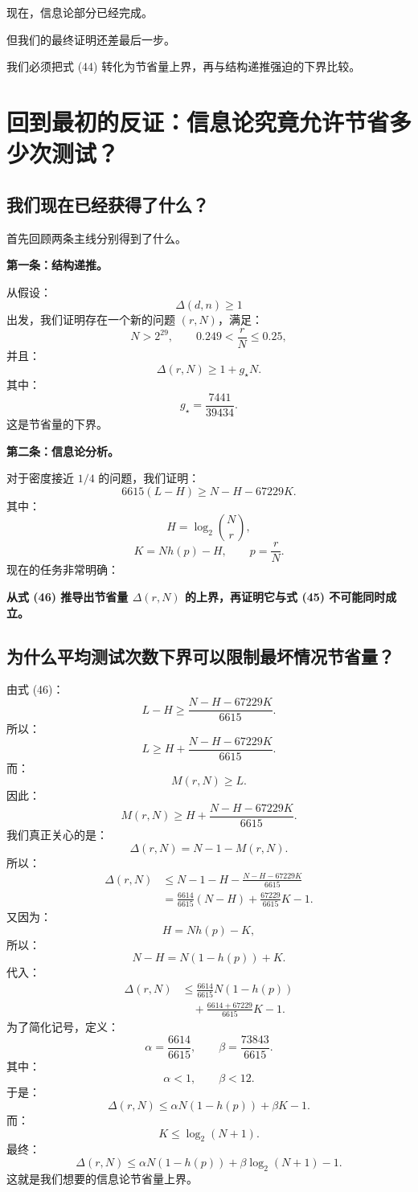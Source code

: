 \documentclass[UTF8,11pt]{ctexart}
\begin{document}
现在，信息论部分已经完成。

但我们的最终证明还差最后一步。

我们必须把式 (44) 转化为节省量上界，再与结构递推强迫的下界比较。

\section{回到最初的反证：信息论究竟允许节省多少次测试？}
\subsection{我们现在已经获得了什么？}
首先回顾两条主线分别得到了什么。

\textbf{第一条：结构递推。}

从假设：
\[\Delta(d,n)\ge1\]
出发，我们证明存在一个新的问题 $(r,N)$，满足：
\[N>2^{29},\qquad0.249<\frac rN\le0.25,\]
并且：
\begin{equation}\boxed{\Delta(r,N)\ge1+g_\star N.}\tag{45}\end{equation}
其中：
\[g_\star=\frac{7441}{39434}.\]
这是节省量的下界。

\textbf{第二条：信息论分析。}

对于密度接近 $1/4$ 的问题，我们证明：
\begin{equation}\boxed{6615(L-H)\ge N-H-67229K.}\tag{46}\end{equation}
其中：
\[H=\log_2\binom Nr,\]
\[K=Nh(p)-H,\qquad p=\frac rN.\]
现在的任务非常明确：

\textbf{从式 (46) 推导出节省量 $\Delta(r,N)$ 的上界，再证明它与式 (45) 不可能同时成立。}

\subsection{为什么平均测试次数下界可以限制最坏情况节省量？}
由式 (46)：
\[L-H\ge\frac{N-H-67229K}{6615}.\]
所以：
\[L\ge H+\frac{N-H-67229K}{6615}.\]
而：
\[M(r,N)\ge L.\]
因此：
\begin{equation}\boxed{M(r,N)\ge H+\frac{N-H-67229K}{6615}.}\tag{47}\end{equation}
我们真正关心的是：
\[\Delta(r,N)=N-1-M(r,N).\]
所以：
\[
\begin{aligned}
\Delta(r,N)&\le N-1-H-\frac{N-H-67229K}{6615}\\
&=\frac{6614}{6615}(N-H)+\frac{67229}{6615}K-1.
\end{aligned}
\]
又因为：
\[H=Nh(p)-K,\]
所以：
\[N-H=N(1-h(p))+K.\]
代入：
\[
\begin{aligned}
\Delta(r,N)&\le\frac{6614}{6615}N(1-h(p))\\
&\quad+\frac{6614+67229}{6615}K-1.
\end{aligned}
\]
为了简化记号，定义：
\begin{equation}\boxed{\alpha=\frac{6614}{6615},\qquad\beta=\frac{73843}{6615}.}\tag{48}\end{equation}
其中：
\[\alpha<1,\qquad\beta<12.\]
于是：
\[\Delta(r,N)\le\alpha N(1-h(p))+\beta K-1.\]
而：
\[K\le\log_2(N+1).\]
最终：
\begin{equation}\boxed{\Delta(r,N)\le\alpha N(1-h(p))+\beta\log_2(N+1)-1.}\tag{49}\end{equation}
这就是我们想要的信息论节省量上界。
\end{document}
